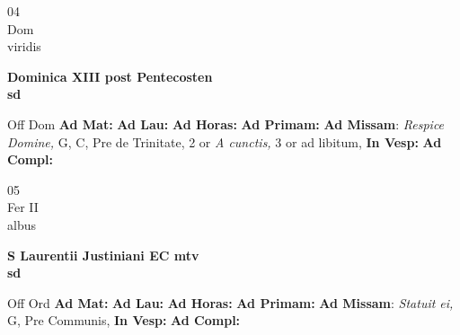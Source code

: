 \documentclass[10pt, openany]{book}
\begin{document}
        \begin{center}
            \begin{minipage}{3.5in}
                \vspace{2em}
                \begin{minipage}{0.5in}
                    {\Huge 04} \\
                    {\normalsize Dom} \\
                    {\normalsize viridis}
                \end{minipage}
                \begin{minipage}{3.0in}
                    \textbf{ \large Dominica XIII post Pentecosten \\
                    \textnormal{\normalsize sd}} \\ 
                \end{minipage}
                \begin{justify}Off Dom
                    \textbf{Ad Mat: }
                    \textbf{Ad Lau: }
                    \textbf{Ad Horas: }
                    \textbf{Ad Primam: }\textbf{Ad Missam}: \textit{Respice Domine,} G, C, Pre de Trinitate, 2 or \textit{A cunctis,} 3 or ad libitum,  
                    \textbf{In Vesp: }
                    \textbf{Ad Compl: }
                \end{justify}
            \end{minipage}
        \end{center}
    
        \begin{center}
            \begin{minipage}{3.5in}
                \vspace{2em}
                \begin{minipage}{0.5in}
                    {\Huge 05} \\
                    {\normalsize Fer II} \\
                    {\normalsize albus}
                \end{minipage}
                \begin{minipage}{3.0in}
                    \textbf{ \large S Laurentii Justiniani EC mtv \\
                    \textnormal{\normalsize sd}} \\ 
                \end{minipage}
                \begin{justify}Off Ord
                    \textbf{Ad Mat: }
                    \textbf{Ad Lau: }
                    \textbf{Ad Horas: }
                    \textbf{Ad Primam: }\textbf{Ad Missam}: \textit{Statuit ei,} G, Pre Communis,  
                    \textbf{In Vesp: }
                    \textbf{Ad Compl: }
                \end{justify}
            \end{minipage}
        \end{center}
    
\end{document}
